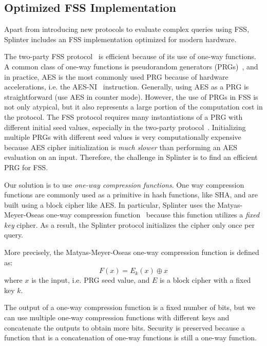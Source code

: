 \subsection{Optimized FSS Implementation}
\label{sec:fastfss}

Apart from introducing new protocols to evaluate complex queries using FSS,
Splinter includes an FSS implementation optimized for modern hardware.

The two-party FSS protocol~\cite{fss} is efficient
because of its use of one-way functions.
A common class of one-way functions is 
pseudorandom generators (PRGs)~\cite{levin1987one}, 
and in practice, 
AES is the most commonly used PRG because of hardware accelerations,
i.e. the AES-NI~\cite{aes-ni} instruction. 
Generally, using AES as a PRG is straightforward (use
AES in counter mode). However, the use of PRGs 
in FSS is not only atypical, but it also represents a large portion
of the computation cost in the protocol. The FSS protocol 
requires many instantiations 
of a PRG with different initial seed 
values, especially in the two-party 
protocol~\cite{fss}. Initializing multiple PRGs with
different seed values is very 
computationally expensive because AES cipher
initialization is \textit{much slower} than performing
an AES evaluation on an input. Therefore, 
the challenge in Splinter is to find an efficient PRG
for FSS.

Our solution is to use \textit{one-way compression functions}.
One way compression functions are commonly used as a primitive
in hash functions, like SHA, and are built using a block
cipher like AES. In particular, Splinter uses the Matyas-Meyer-Oseas one-way 
compression function~\cite{matyas1985} because
this function utilizes a \textit{fixed key} cipher. As a result, 
the Splinter protocol initializes the cipher only once per query.

More precisely, the Matyas-Meyer-Oseas one-way compression
function is defined as:
\begin{equation*}
F(x) = E_k(x) \oplus x
\end{equation*}
where $x$ is the input, i.e. PRG seed value, and $E$ is a block cipher with a fixed key $k$.

The output of a one-way compression function 
is a fixed number of bits, but we can
use multiple one-way compression functions with
different keys and concatenate the outputs to obtain more bits.
Security is preserved because a function that
is a concatenation of one-way functions is still a one-way function.

